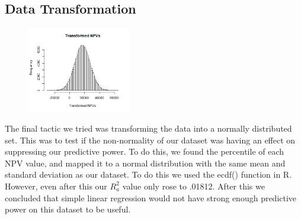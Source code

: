 \documentclass[12 pt]{uncw_thesis}
\theoremstyle{plain}
\theoremstyle{remark}
\theoremstyle{definition}
\begin{document}
\subsection{Data Transformation}
\begin{figure}
	\vspace{-2\normalbaselineskip}
	\centering
	\includegraphics[width=0.4\textwidth]{images/Transformed.jpeg}
	\vspace{-\normalbaselineskip}
\end{figure}

The final tactic we tried was transforming the data into a normally distributed set. This was to test if the non-normality of our dataset was having an effect on suppressing our predictive power. To do this, we found the percentile of each NPV value, and mapped it to a normal distribution with the same mean and standard deviation as our dataset. To do this we used the ecdf() function in R. However, even after this our \(R_a^2\) value only rose to .01812. After this we concluded that simple linear regression would not have strong enough predictive power on this dataset to be useful.
\end{document}
